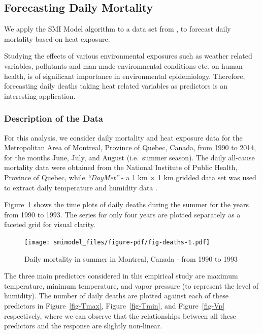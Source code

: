 \documentclass[11pt,a4paper,]{article}
\begin{document}
\hypertarget{forecasting-daily-mortality}{%
\subsection{Forecasting Daily
Mortality}\label{forecasting-daily-mortality}}

We apply the SMI Model algorithm to a data set from
\textcite{Masselot2022}, to forecast daily mortality based on heat
exposure.

Studying the effects of various environmental exposures such as weather
related variables, pollutants and man-made environmental conditions etc.
on human health, is of significant importance in environmental
epidemiology. Therefore, forecasting daily deaths taking heat related
variables as predictors is an interesting application.

\hypertarget{description-of-the-data}{%
\subsubsection{Description of the Data}\label{description-of-the-data}}

For this analysis, we consider daily mortality and heat exposure data
for the Metropolitan Area of Montreal, Province of Quebec, Canada, from
1990 to 2014, for the months June, July, and August (i.e.~summer
season). The daily all-cause mortality data were obtained from the
National Institute of Public Health, Province of Quebec, while
\emph{``DayMet''} - a 1 km × 1 km gridded data set
\autocite{Thornton2021} was used to extract daily temperature and
humidity data \autocite{Masselot2022}.

Figure~\ref{fig-deaths} shows the time plots of daily deaths during the
summer for the years from 1990 to 1993. The series for only four years
are plotted separately as a faceted grid for visual clarity.

\begin{figure}

{\centering \texttt{[image: smimodel\_files/figure-pdf/fig-deaths-1.pdf]}

}

\caption{\label{fig-deaths}Daily mortality in summer in Montreal, Canada
- from 1990 to 1993}

\end{figure}

The three main predictors considered in this empirical study are maximum
temperature, minimum temperature, and vapor pressure (to represent the
level of humidity). The number of daily deaths are plotted against each
of these predictors in Figure~\ref{fig-Tmax}, Figure~\ref{fig-Tmin}, and
Figure~\ref{fig-Vp} respectively, where we can observe that the
relationships between all these predictors and the response are slightly
non-linear.
\end{document}
